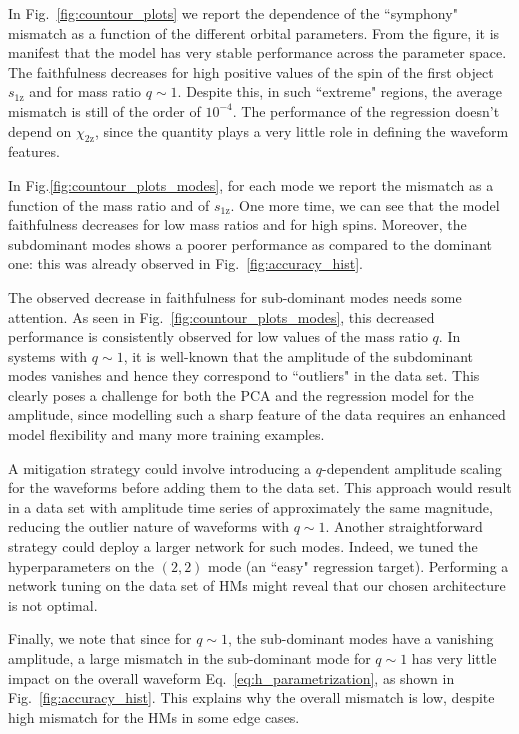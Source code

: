 \documentclass[twocolumn,showpacs,preprintnumbers,nofootinbib,prd,
superscriptaddress,10pt]{revtex4-1}
\begin{document}
{In Fig.~\ref{fig:countour_plots} we report the dependence of the ``symphony" mismatch as a function of the different orbital parameters.
From the figure, it is manifest that the model has very stable performance across the parameter space.
The faithfulness decreases for high positive values of the spin of the first object $s_\text{1z}$ and for mass ratio $q\sim 1$. Despite this, in such ``extreme" regions, the average mismatch is still of the order of $10^{-4}$.
The performance of the regression doesn't depend on $\chi_\text{2z}$, since the quantity plays a very little role in defining the waveform features.

In Fig.\ref{fig:countour_plots_modes}, for each mode we report the mismatch as a function of the mass ratio and of $s_\text{1z}$. One more time, we can see that the model faithfulness decreases for low mass ratios and for high spins. Moreover, the subdominant modes shows a poorer performance as compared to the dominant one: this was already observed in Fig.~\ref{fig:accuracy_hist}.

The observed decrease in faithfulness for sub-dominant modes needs some attention.
As seen in Fig.~\ref{fig:countour_plots_modes}, this decreased performance is consistently observed for low values of the mass ratio $q$. 
In systems with $q \sim 1$, it is well-known that the amplitude of the subdominant modes vanishes and hence they correspond to ``outliers" in the data set.
This clearly poses a challenge for both the PCA and the regression model for the amplitude, since modelling such a sharp feature of the data requires an enhanced model flexibility and many more training examples.

A mitigation strategy could involve introducing a $q$-dependent amplitude scaling for the waveforms before adding them to the data set. This approach would result in a data set with amplitude time series of approximately the same magnitude, reducing the outlier nature of waveforms with $q \sim 1$.
Another straightforward strategy could deploy a larger network for such modes. Indeed, we tuned the hyperparameters on the $(2,2)$ mode (an ``easy" regression target). Performing a network tuning on the data set of HMs might reveal that our chosen architecture is not optimal.

Finally, we note that since for $q\sim 1$, the sub-dominant modes have a vanishing amplitude, a large mismatch in the 
sub-dominant mode for $q\sim 1$ has very little impact on the overall waveform Eq.~\eqref{eq:h_parametrization}, 
as shown in Fig.~\ref{fig:accuracy_hist}.
This explains why the overall mismatch is low, despite high mismatch for the HMs in some edge cases.

}
\end{document}
